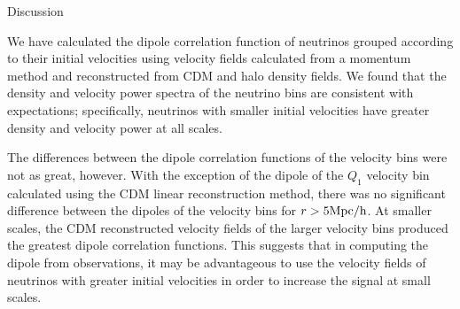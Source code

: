 \begin{section}{Discussion}
  \label{sec:discussion}

  We have calculated the dipole correlation function of neutrinos 
grouped according to their initial velocities using velocity fields
calculated from a momentum method and reconstructed from CDM and halo
density fields. We found that the density and velocity power spectra
of the neutrino bins are consistent with expectations; specifically,
neutrinos with smaller initial velocities have greater density and
velocity power at all scales.
 
\par The differences between the dipole correlation functions 
of the velocity bins were not as great, however. With the 
exception of the dipole of the $Q_1$ velocity bin 
calculated using the CDM linear reconstruction method, there was no significant 
difference between the dipoles of the velocity bins for $r>5\mbox{Mpc}/\mbox{h}$. 
At smaller scales, the CDM reconstructed velocity fields of 
the larger velocity bins produced the greatest dipole 
correlation functions. This suggests that in computing the 
dipole from observations, it may be advantageous to use the 
velocity fields of neutrinos with greater initial velocities 
in order to increase the signal at small scales.  
 
\end{section}
